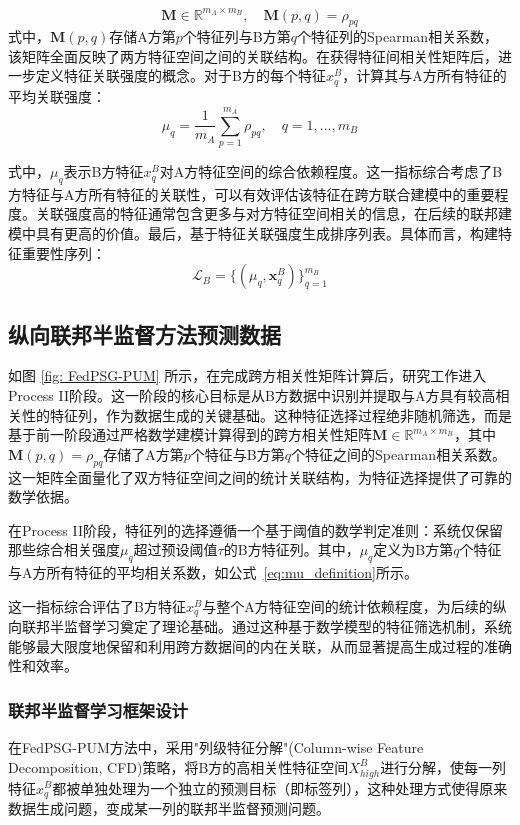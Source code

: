 \begin{equation}
	\mathbf{M} \in \mathbb{R}^{m_A \times m_B}, \quad \mathbf{M}(p,q) = \rho_{pq}
\end{equation}
式中，$\mathbf{M}(p,q)$存储A方第$p$个特征列与B方第$q$个特征列的Spearman相关系数，该矩阵全面反映了两方特征空间之间的关联结构。在获得特征间相关性矩阵后，进一步定义特征关联强度的概念。对于B方的每个特征$x^B_q$，计算其与A方所有特征的平均关联强度：
\begin{equation}
	\mu_q = \frac{1}{m_A} \sum_{p=1}^{m_A} \rho_{pq}, \quad q=1,...,m_B
	\label{eq:mu_definition}
\end{equation}

式中，$\mu_q$表示B方特征$x^B_q$对A方特征空间的综合依赖程度。这一指标综合考虑了B方特征与A方所有特征的关联性，可以有效评估该特征在跨方联合建模中的重要程度。关联强度高的特征通常包含更多与对方特征空间相关的信息，在后续的联邦建模中具有更高的价值。最后，基于特征关联强度生成排序列表。具体而言，构建特征重要性序列：
\begin{equation}
	\mathcal{L}_B = \{(\mu_q, \mathbf{x}^B_q)\}_{q=1}^{m_B}
\end{equation}
\subsection{纵向联邦半监督方法预测数据}
如图 \ref{fig: FedPSG-PUM} 所示，在完成跨方相关性矩阵计算后，研究工作进入Process II阶段。这一阶段的核心目标是从B方数据中识别并提取与A方具有较高相关性的特征列，作为数据生成的关键基础。这种特征选择过程绝非随机筛选，而是基于前一阶段通过严格数学建模计算得到的跨方相关性矩阵$\mathbf{M} \in \mathbb{R}^{m_A \times m_B}$，其中$\mathbf{M}(p,q) = \rho_{pq}$存储了A方第$p$个特征与B方第$q$个特征之间的Spearman相关系数。这一矩阵全面量化了双方特征空间之间的统计关联结构，为特征选择提供了可靠的数学依据。

在Process II阶段，特征列的选择遵循一个基于阈值的数学判定准则：系统仅保留那些综合相关强度$\mu_q$超过预设阈值$\tau$的B方特征列。其中，$\mu_q$定义为B方第$q$个特征与A方所有特征的平均相关系数，如公式~\eqref{eq:mu_definition}所示。

这一指标综合评估了B方特征$x^B_q$与整个A方特征空间的统计依赖程度，为后续的纵向联邦半监督学习奠定了理论基础。通过这种基于数学模型的特征筛选机制，系统能够最大限度地保留和利用跨方数据间的内在关联，从而显著提高生成过程的准确性和效率。

\subsubsection{联邦半监督学习框架设计}
在FedPSG-PUM方法中，采用"列级特征分解"(Column-wise Feature Decomposition, CFD)策略，将B方的高相关性特征空间$X^B_{high}$进行分解，使每一列特征$x^B_q$都被单独处理为一个独立的预测目标（即标签列），这种处理方式使得原来数据生成问题，变成某一列的联邦半监督预测问题。

